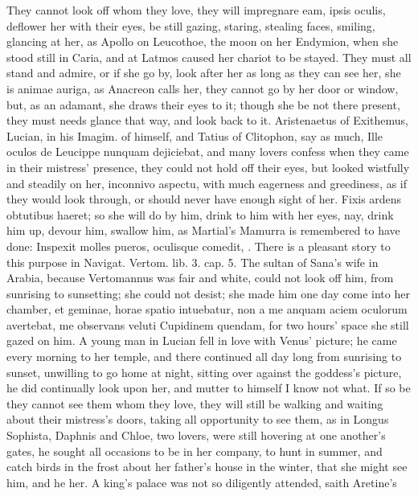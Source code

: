 {They cannot look off whom they love, they will impregnare eam, ipsis
oculis, deflower her with their eyes, be still gazing, staring,
stealing faces, smiling, glancing at her, as Apollo on Leucothoe,
the moon on her Endymion, when she stood still in Caria, and at
Latmos caused her chariot to be stayed. They must all stand and admire,
or if she go by, look after her as long as they can see her, she is
animae auriga, as Anacreon calls her, they cannot go by her door or
window, but, as an adamant, she draws their eyes to it; though she be
not there present, they must needs glance that way, and look back to
it. Aristenaetus of  Exithemus, Lucian, in his Imagim. of
himself, and Tatius of Clitophon, say as much, Ille oculos de Leucippe
nunquam dejiciebat, and many lovers confess when they came in
their mistress' presence, they could not hold off their eyes, but
looked wistfully and steadily on her, inconnivo aspectu, with much
eagerness and greediness, as if they would look through, or should
never have enough sight of her. Fixis ardens obtutibus haeret; so she
will do by him, drink to him with her eyes, nay, drink him up, devour
him, swallow him, as Martial's Mamurra is remembered to have done:
Inspexit molles pueros, oculisque comedit, \etc{}. There is a pleasant
story to this purpose in Navigat. Vertom. lib. 3. cap. 5. The sultan of
Sana's wife in Arabia, because Vertomannus was fair and white, could
not look off him, from sunrising to sunsetting; she could not desist;
she made him one day come into her chamber, et geminae, horae spatio
intuebatur, non a me anquam aciem oculorum avertebat, me observans
veluti Cupidinem quendam, for two hours' space she still gazed on him.
A young man in Lucian fell in love with Venus' picture; he came
every morning to her temple, and there continued all day long
from sunrising to sunset, unwilling to go home at night, sitting
over against the goddess's picture, he did continually look upon her,
and mutter to himself I know not what. If so be they cannot see them
whom they love, they will still be walking and waiting about their
mistress's doors, taking all opportunity to see them, as in
Longus Sophista, Daphnis and Chloe, two lovers, were still
hovering at one another's gates, he sought all occasions to be in her
company, to hunt in summer, and catch birds in the frost about her
father's house in the winter, that she might see him, and he her.
A king's palace was not so diligently attended, saith Aretine's
}
